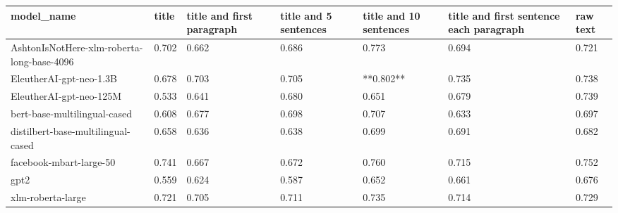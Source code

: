 \begin{tabular}{lllllll}
\toprule
                                model\_name & title & title and first paragraph & title and 5 sentences & title and 10 sentences & title and first sentence each paragraph & raw text \\
\midrule
AshtonIsNotHere-xlm-roberta-long-base-4096 & 0.702 &                     0.662 &                 0.686 &                  0.773 &                                   0.694 &    0.721 \\
                   EleutherAI-gpt-neo-1.3B & 0.678 &                     0.703 &                 0.705 &              **0.802** &                                   0.735 &    0.738 \\
                   EleutherAI-gpt-neo-125M & 0.533 &                     0.641 &                 0.680 &                  0.651 &                                   0.679 &    0.739 \\
              bert-base-multilingual-cased & 0.608 &                     0.677 &                 0.698 &                  0.707 &                                   0.633 &    0.697 \\
        distilbert-base-multilingual-cased & 0.658 &                     0.636 &                 0.638 &                  0.699 &                                   0.691 &    0.682 \\
                   facebook-mbart-large-50 & 0.741 &                     0.667 &                 0.672 &                  0.760 &                                   0.715 &    0.752 \\
                                      gpt2 & 0.559 &                     0.624 &                 0.587 &                  0.652 &                                   0.661 &    0.676 \\
                         xlm-roberta-large & 0.721 &                     0.705 &                 0.711 &                  0.735 &                                   0.714 &    0.729 \\
\bottomrule
\end{tabular}
